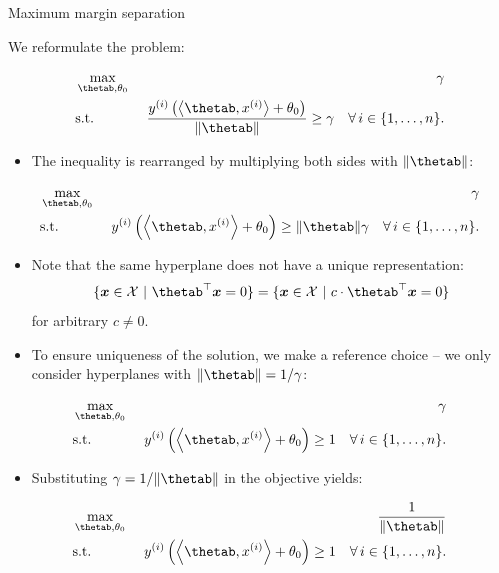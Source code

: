 \begin{vbframe}{Maximum margin separation}

We reformulate the problem:

\begin{eqnarray*}
   & \max \limits_{\thetab, \theta_0} & \gamma \\
   & \text{s.t.} & \,\, \frac{\yi \left( \scp{\thetab}{\xi} + \theta_0 \right)}{\|\thetab\|} \geq \gamma \quad \forall\, i \in \nset.
\end{eqnarray*}

\begin{itemize}
  \item The inequality is rearranged by multiplying both sides with $\|\thetab\|$:
\end{itemize}

\begin{eqnarray*}
   & \max \limits_{\thetab, \theta_0} & \gamma \\
   & \text{s.t.} & \,\,\yi  \left( \scp{\thetab}{\xi} + \theta_0 \right) \geq \|\thetab\| \gamma \quad \forall\, i \in \nset.
\end{eqnarray*}

\framebreak

  \begin{itemize}
    \item Note that the same hyperplane does not have a unique representation:
    $$
      \{\xv \in \Xspace ~|~ \thetab^\top \xv = 0\} = \{\xv \in \Xspace ~|~ c \cdot \thetab^\top \xv = 0\}
    $$
    for arbitrary $c \ne 0$.
    \item To ensure uniqueness of the solution, we make a reference choice -- we only consider hyperplanes with $\|\thetab\| = 1 / \gamma$:
  \end{itemize}

  \begin{eqnarray*}
     & \max \limits_{\thetab, \theta_0} & \gamma \\
     & \text{s.t.} & \,\,\yi  \left( \scp{\thetab}{\xi} + \theta_0 \right) \geq 1 \quad \forall\, i \in \nset.
  \end{eqnarray*}

\framebreak

  \begin{itemize}
    \item Substituting $\gamma = 1 / \|\thetab\|$ in the objective yields:
  \end{itemize}

  \begin{eqnarray*}
     & \max \limits_{\thetab, \theta_0} & \frac{1}{\|\thetab\|} \\
     & \text{s.t.} & \,\,\yi  \left( \scp{\thetab}{\xi} + \theta_0 \right) \geq 1 \quad \forall\, i \in \nset.
  \end{eqnarray*}


\end{vbframe}
